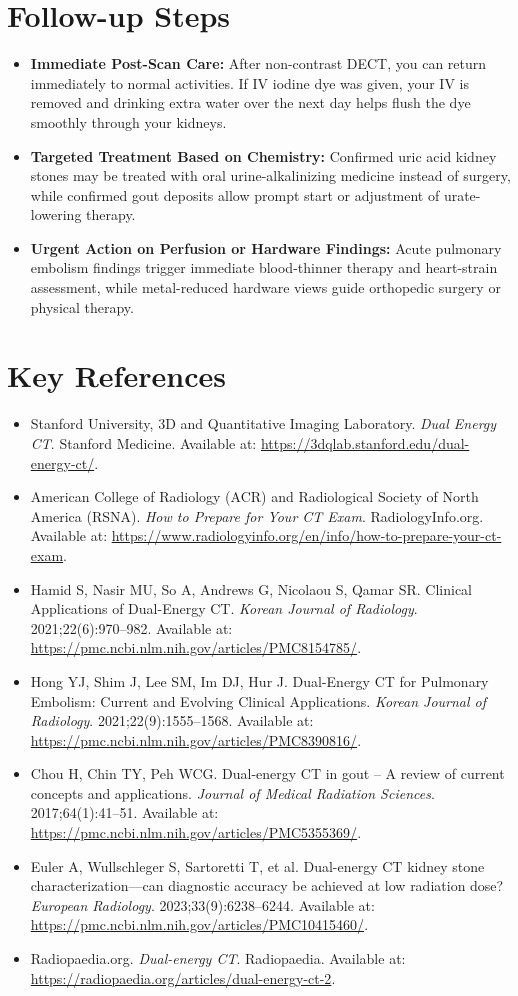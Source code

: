 \section{Follow-up Steps}
\begin{itemize}
\item \textbf{Immediate Post-Scan Care:} After non-contrast DECT, you can return immediately to normal activities. If IV iodine dye was given, your IV is removed and drinking extra water over the next day helps flush the dye smoothly through your kidneys.
\item \textbf{Targeted Treatment Based on Chemistry:} Confirmed uric acid kidney stones may be treated with oral urine-alkalinizing medicine instead of surgery, while confirmed gout deposits allow prompt start or adjustment of urate-lowering therapy.
\item \textbf{Urgent Action on Perfusion or Hardware Findings:} Acute pulmonary embolism findings trigger immediate blood-thinner therapy and heart-strain assessment, while metal-reduced hardware views guide orthopedic surgery or physical therapy.
\end{itemize}

\section{Key References}
\begin{itemize}
\item Stanford University, 3D and Quantitative Imaging Laboratory. \textit{Dual Energy CT}. Stanford Medicine. Available at: \url{https://3dqlab.stanford.edu/dual-energy-ct/}.
\item American College of Radiology (ACR) and Radiological Society of North America (RSNA). \textit{How to Prepare for Your CT Exam}. RadiologyInfo.org. Available at: \url{https://www.radiologyinfo.org/en/info/how-to-prepare-your-ct-exam}.
\item Hamid S, Nasir MU, So A, Andrews G, Nicolaou S, Qamar SR. Clinical Applications of Dual-Energy CT. \textit{Korean Journal of Radiology}. 2021;22(6):970--982. Available at: \url{https://pmc.ncbi.nlm.nih.gov/articles/PMC8154785/}.
\item Hong YJ, Shim J, Lee SM, Im DJ, Hur J. Dual-Energy CT for Pulmonary Embolism: Current and Evolving Clinical Applications. \textit{Korean Journal of Radiology}. 2021;22(9):1555--1568. Available at: \url{https://pmc.ncbi.nlm.nih.gov/articles/PMC8390816/}.
\item Chou H, Chin TY, Peh WCG. Dual-energy CT in gout -- A review of current concepts and applications. \textit{Journal of Medical Radiation Sciences}. 2017;64(1):41--51. Available at: \url{https://pmc.ncbi.nlm.nih.gov/articles/PMC5355369/}.
\item Euler A, Wullschleger S, Sartoretti T, et al. Dual-energy CT kidney stone characterization---can diagnostic accuracy be achieved at low radiation dose? \textit{European Radiology}. 2023;33(9):6238--6244. Available at: \url{https://pmc.ncbi.nlm.nih.gov/articles/PMC10415460/}.
\item Radiopaedia.org. \textit{Dual-energy CT}. Radiopaedia. Available at: \url{https://radiopaedia.org/articles/dual-energy-ct-2}.
\end{itemize}

